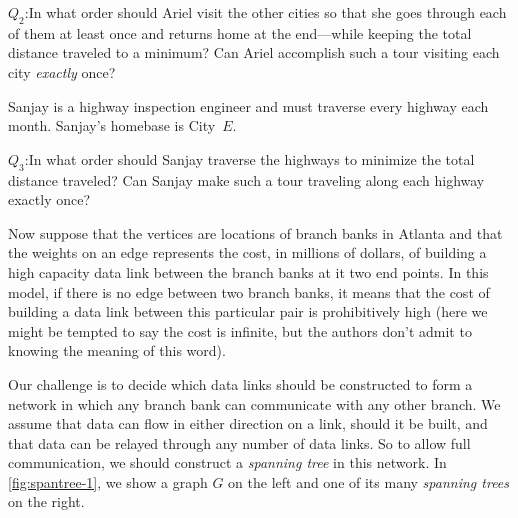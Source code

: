 \begin{example}
\medskip
\noindent
$Q_2$:\quad In what order should Ariel visit the other cities so that she
goes through each of them at least once and returns home
at the end---while keeping the total distance traveled to a minimum?  
Can Ariel accomplish such a tour visiting
each city \textit{exactly} once? 

\medskip
Sanjay is a highway inspection engineer and must traverse every
highway each month.  Sanjay's homebase is City~$E$.  

\medskip
\noindent
$Q_3$:\quad In what
order should Sanjay traverse the highways to minimize the total
distance traveled?  Can Sanjay make such a tour traveling
along each highway exactly once?
\end{example}

\begin{example}
  Now suppose that the vertices are locations of branch banks in
  Atlanta and that the weights on an edge represents the cost, in
  millions of dollars, of building a high capacity data link between
  the branch banks at it two end points.  In this model, if there is
  no edge between two branch banks, it means that the cost of building
  a data link between this particular pair is prohibitively high (here
  we might be tempted to say the cost is infinite, but the authors don't
  admit to knowing the meaning of this word).

  Our challenge is to decide which data links should be constructed to
  form a network in which any branch bank can communicate with any
  other branch.  We assume that data can flow in either direction on a
  link, should it be built, and that data can be relayed through any
  number of data links.  So to allow full communication, we should
  construct a \textit{spanning tree} in this network.  In
  \autoref{fig:spantree-1}, we show a graph $G$ on the left and one of
  its many \textit{spanning trees} on the right.


\end{example}
